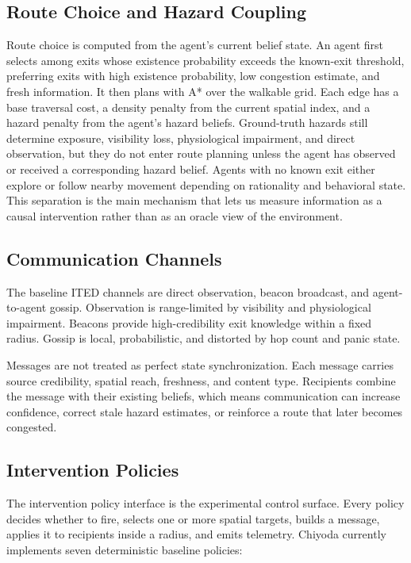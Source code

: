 \subsection{Route Choice and Hazard Coupling}
\label{subsec:route-choice}

Route choice is computed from the agent's current belief state. An agent first
selects among exits whose existence probability exceeds the known-exit
threshold, preferring exits with high existence probability, low congestion
estimate, and fresh information. It then plans with A* over the walkable grid.
Each edge has a base traversal cost, a density penalty from the current spatial
index, and a hazard penalty from the agent's hazard beliefs. Ground-truth
hazards still determine exposure, visibility loss, physiological impairment,
and direct observation, but they do not enter route planning unless the agent
has observed or received a corresponding hazard belief. Agents with no known
exit either explore or follow nearby movement depending on rationality and
behavioral state. This separation is the main mechanism that lets us
measure information as a causal intervention rather than as an oracle view of
the environment.

\subsection{Communication Channels}
\label{subsec:channels}

The baseline ITED channels are direct observation, beacon broadcast, and
agent-to-agent gossip. Observation is range-limited by visibility and
physiological impairment. Beacons provide high-credibility exit knowledge
within a fixed radius. Gossip is local, probabilistic, and distorted by hop
count and panic state.

Messages are not treated as perfect state synchronization. Each message carries
source credibility, spatial reach, freshness, and content type. Recipients
combine the message with their existing beliefs, which means communication can
increase confidence, correct stale hazard estimates, or reinforce a route that
later becomes congested.

\subsection{Intervention Policies}
\label{subsec:policies}

The intervention policy interface is the experimental control surface. Every
policy decides whether to fire, selects one or more spatial targets, builds a
message, applies it to recipients inside a radius, and emits telemetry. Chiyoda
currently implements seven deterministic baseline policies:


